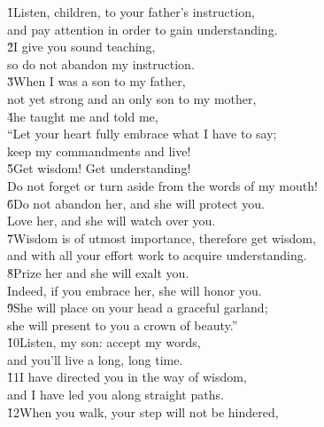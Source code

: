 \begin{poetry}
\poeml {}
\v{1}Listen, children, to your father's instruction, \\
\poeml and pay attention in order to gain understanding. \\
\poeml \v{2}I give you sound teaching, \\
\poeml so do not abandon my instruction. \\
\poeml \v{3}When I was a son to my father, \\
\poemll    not yet strong and an only son to my mother, \\
\poeml \v{4}he taught me and told me, \\
\poemll    ``Let your heart fully embrace what I have to say; \\
\poemlll       keep my commandments and live! \\
\poeml \v{5}Get wisdom! Get understanding! \\
\poemll    Do not forget or turn aside from the words of my mouth! \\
\poeml \v{6}Do not abandon her, and she will protect you. \\
\poemll    Love her, and she will watch over you. \\
\poeml \v{7}Wisdom is of utmost importance, therefore get wisdom, \\
\poemll    and with all your effort work to acquire understanding. \\
\poeml \v{8}Prize her and she will exalt you. \\
\poemll    Indeed, if you embrace her, she will honor you. \\
\poeml \v{9}She will place on your head a graceful garland; \\
\poemll    she will present to you a crown of beauty.'' \\
\poeml \v{10}Listen, my son: accept my words, \\
\poemll    and you'll live a long, long time. \\
\poeml \v{11}I have directed you in the way of wisdom, \\
\poemll    and I have led you along straight paths. \\
\poeml \v{12}When you walk, your step will not be hindered, \\

\end{poetry}
